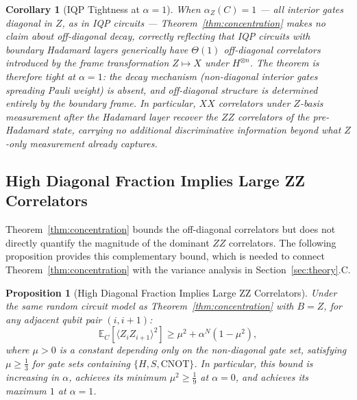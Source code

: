 \documentclass[conference]{IEEEtran}
\newtheorem{proposition}[theorem]{Proposition}
\newtheorem{corollary}[theorem]{Corollary}
\newcommand{\nqubits}{n}
\begin{document}
\begin{corollary}[IQP Tightness at $\alpha = 1$]
\label{cor:iqp_tight}
When $\alpha_Z(C) = 1$ --- all interior gates diagonal in $Z$, as in IQP circuits --- Theorem~\ref{thm:concentration} makes no claim about off-diagonal decay, correctly reflecting that IQP circuits with boundary Hadamard layers generically have $\Theta(1)$ off-diagonal correlators introduced by the frame transformation $Z \mapsto X$ under $H^{\otimes \nqubits}$. The theorem is therefore tight at $\alpha = 1$: the decay mechanism (non-diagonal interior gates spreading Pauli weight) is absent, and off-diagonal structure is determined entirely by the boundary frame. In particular, $XX$ correlators under $Z$-basis measurement after the Hadamard layer recover the $ZZ$ correlators of the pre-Hadamard state, carrying no additional discriminative information beyond what $Z$-only measurement already captures.
\end{corollary}

\subsection{High Diagonal Fraction Implies Large ZZ Correlators}

Theorem~\ref{thm:concentration} bounds the off-diagonal correlators but does not directly quantify the magnitude of the dominant $ZZ$ correlators. The following proposition provides this complementary bound, which is needed to connect Theorem~\ref{thm:concentration} with the variance analysis in Section~\ref{sec:theory}.C.

\begin{proposition}[High Diagonal Fraction Implies Large ZZ Correlators]
\label{prop:bridge}
Under the same random circuit model as Theorem~\ref{thm:concentration} with $B = Z$, for any adjacent qubit pair $(i, i+1)$:
\[
\mathbb{E}_C\!\left[\langle Z_i Z_{i+1} \rangle^2\right] \geq \mu^2 + \alpha^N(1 - \mu^2),
\]
where $\mu > 0$ is a constant depending only on the non-diagonal gate set, satisfying $\mu \geq \frac{1}{3}$ for gate sets containing $\{H, S, \mathrm{CNOT}\}$. In particular, this bound is increasing in $\alpha$, achieves its minimum $\mu^2 \geq \frac{1}{9}$ at $\alpha = 0$, and achieves its maximum $1$ at $\alpha = 1$.
\end{proposition}
\end{document}
